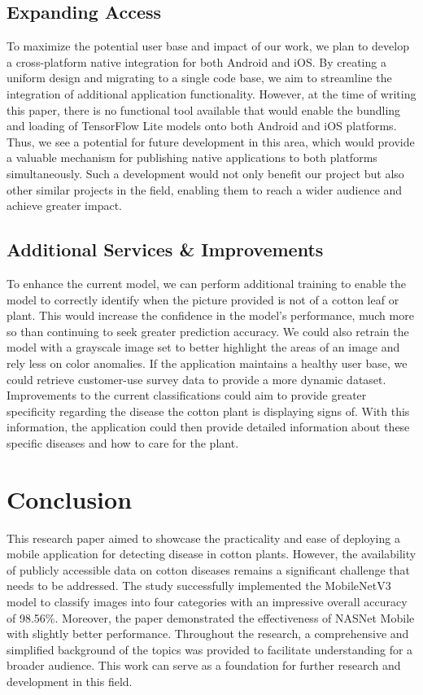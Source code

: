 \documentclass[conference]{IEEEtran}
\begin{document}
\subsection{Expanding Access}
To maximize the potential user base and impact of our work, we plan to develop a cross-platform native integration for both Android and iOS. By creating a uniform design and migrating to a single code base, we aim to streamline the integration of additional application functionality. However, at the time of writing this paper, there is no functional tool available that would enable the bundling and loading of TensorFlow Lite models onto both Android and iOS platforms. Thus, we see a potential for future development in this area, which would provide a valuable mechanism for publishing native applications to both platforms simultaneously. Such a development would not only benefit our project but also other similar projects in the field, enabling them to reach a wider audience and achieve greater impact.

\subsection{Additional Services \& Improvements }
To enhance the current model, we can perform additional training to enable the model to correctly identify when the picture provided is not of a cotton leaf or plant. This would increase the confidence in the model's performance, much more so than continuing to seek greater prediction accuracy. We could also retrain the model with a grayscale image set to better highlight the areas of an image and rely less on color anomalies. If the application maintains a healthy user base, we could retrieve customer-use survey data to provide a more dynamic dataset. Improvements to the current classifications could aim to provide greater specificity regarding the disease the cotton plant is displaying signs of. With this information, the application could then provide detailed information about these specific diseases and how to care for the plant.



\section{Conclusion}
This research paper aimed to showcase the practicality and ease of deploying a mobile application for detecting disease in cotton plants. However, the availability of publicly accessible data on cotton diseases remains a significant challenge that needs to be addressed. The study successfully implemented the MobileNetV3 model to classify images into four categories with an impressive overall accuracy of 98.56\%. Moreover, the paper demonstrated the effectiveness of NASNet Mobile with slightly better performance. Throughout the research, a comprehensive and simplified background of the topics was provided to facilitate understanding for a broader audience. This work can serve as a foundation for further research and development in this field.
\end{document}
